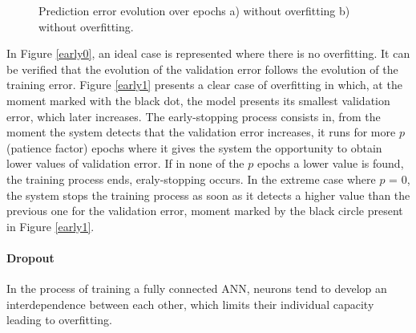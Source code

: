 \begin{figure}[h!]
\captionsetup[subfigure]{position=b}
\centering
{}
\hspace{0.05\textwidth}
\caption{Prediction error evolution over epochs a) without overfitting b) without overfitting.}
\label{early}
\end{figure}

In Figure \ref{early0}, an ideal case is represented where there is no overfitting. It can be verified that the evolution of the validation error follows the evolution of the training error. Figure \ref{early1} presents a clear case of overfitting in which, at the moment marked with the black dot, the model presents its smallest validation error, which later increases. The early-stopping process consists in, from the moment the system detects that the validation error increases, it runs for more $p$ (patience factor) epochs where it gives the system the opportunity to obtain lower values of validation error. If in none of the $p$ epochs a lower value is found, the training process ends, eraly-stopping occurs. In the extreme case where $p$ = 0, the system stops the training process as soon as it detects a higher value than the previous one for the validation error, moment marked by the black circle present in Figure \ref{early1}.

\paragraph{Dropout}

In the process of training a fully connected \ac{ANN}, neurons tend to develop an interdependence between each other, which limits their individual capacity leading to overfitting.


